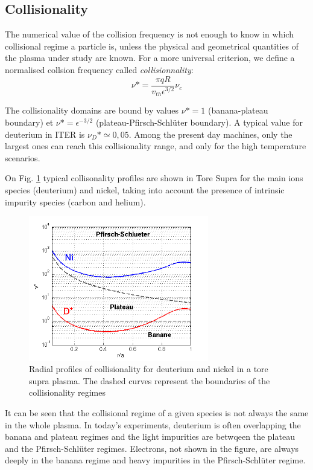 				\subsection{Collisionality}
				\label{Collisionnalite}

The numerical value of the collision frequency is not enough to know in which collisional regime a particle is, unless the physical and geometrical quantities of the plasma under study are known. For a more universal criterion, we define a normalised collsion frequency called \textit{collisionnality}:
\[
		\nu* = \frac{\pi q R}{v_{th}\epsilon^{3/2}}\nu_c
\]

The collisionality domains are bound by values $\nu* = 1$ (banana-plateau boundary) et $\nu* = \epsilon^{-3/2}$ (plateau-Pfirsch-Schlüter boundary). A typical value for deuterium in ITER is $\nu_D* \simeq 0,05$. Among the present day machines, only the largest ones can reach this collisionality range, and only for the high temperature scenarios.

On Fig. \ref{fig:nustar_D_Ni_39601} typical collisonality profiles are shown  in Tore Supra for the main ions species (deuterium) and nickel, taking into account the presence of intrinsic impurity species (carbon and helium).
\begin{figure}[htbp]
	\centering
		\includegraphics[width=0.70\textwidth]{Fig_nustar_D_Ni_39601.png}
	\caption{Radial profiles of collisionality for deuterium and nickel in a tore supra plasma. The dashed curves represent the boundaries of the collisionality regimes}
	\label{fig:nustar_D_Ni_39601}
\end{figure}

It can be seen that the collisional regime of a given species is not always the same in the whole plasma. In today's experiments, deuterium is often overlapping the banana and plateau regimes and the light impurities are betwqeen the plateau and the Pfirsch-Schlüter regimes. Electrons, not shown in the figure, are always deeply in the banana regime and heavy impurities in the Pfirsch-Schlüter regime.
		
